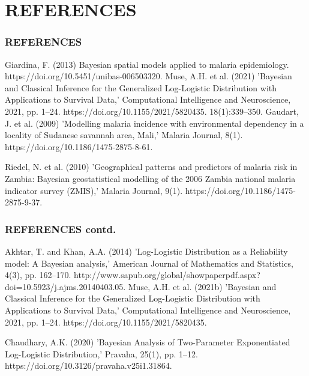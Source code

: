 \documentclass{beamer}
\begin{document}
\section{REFERENCES}
\begin{frame}
	\frametitle{\textbf{REFERENCES}}
\begin{center}
	\begin{thebibliography}{99}
	 Giardina, F. (2013) Bayesian spatial models applied to malaria epidemiology. https://doi.org/10.5451/unibas-006503320.
        Muse, A.H. et al. (2021) 'Bayesian and Classical Inference for the Generalized Log-Logistic Distribution with Applications to Survival Data,' Computational Intelligence and Neuroscience, 2021, pp. 1–24. https://doi.org/10.1155/2021/5820435.
18(1):339–350.
         Gaudart, J. et al. (2009) 'Modelling malaria incidence with environmental dependency in a locality of Sudanese savannah area, Mali,' Malaria Journal, 8(1). https://doi.org/10.1186/1475-2875-8-61.
  
	  Riedel, N. et al. (2010) 'Geographical patterns and predictors of malaria risk in Zambia: Bayesian geostatistical modelling of the 2006 Zambia national malaria indicator survey (ZMIS),' Malaria Journal, 9(1). https://doi.org/10.1186/1475-2875-9-37.





	
	
			
		 
			
\end{thebibliography}
\end{center}	
\end{frame}

\begin{frame}
	\frametitle{\textbf{REFERENCES contd.}}
\begin{center}
	\begin{thebibliography}{99}

          Akhtar, T. and Khan, A.A. (2014) 'Log-Logistic Distribution as a Reliability model: A Bayesian analysis,' American Journal of Mathematics and Statistics, 4(3), pp. 162–170. http://www.sapub.org/global/showpaperpdf.aspx?doi=10.5923/j.ajms.20140403.05.
	 Muse, A.H. et al. (2021b) 'Bayesian and Classical Inference for the Generalized Log-Logistic Distribution with Applications to Survival Data,' Computational Intelligence and Neuroscience, 2021, pp. 1–24. https://doi.org/10.1155/2021/5820435.

 Chaudhary, A.K. (2020) 'Bayesian Analysis of Two-Parameter Exponentiated Log-Logistic Distribution,' Pravaha, 25(1), pp. 1–12. https://doi.org/10.3126/pravaha.v25i1.31864.


		
			
\end{thebibliography}
\end{center}	
\end{frame}
\end{document}
